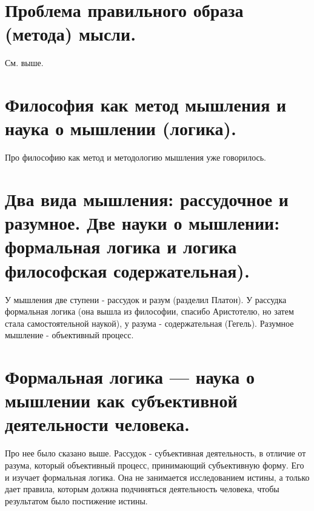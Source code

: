 \section{ Проблема правильного образа (метода) мысли.}
См. выше.

\section{ Философия как метод мышления и наука о мышлении (логика).}
Про философию как метод и методологию мышления уже говорилось. 

\section{ Два вида мышления: рассудочное и разумное. Две науки о мышлении: формальная логика и логика философская содержательная).}
У мышления две ступени - рассудок и разум (разделил Платон). У рассудка формальная логика (она вышла из философии, спасибо Аристотелю, но затем стала самостоятельной наукой), у разума - содержательная (Гегель). Разумное мышление - объективный процесс.

\section{ Формальная логика — наука о мышлении как субъективной деятельности человека.}
Про нее было сказано выше. Рассудок - субъективная деятельность, в отличие от разума, который объективный процесс, принимающий субъективную форму. Его и изучает формальная логика. Она не занимается исследованием истины, а только дает правила, которым должна подчиняться деятельность человека, чтобы результатом было постижение истины.


